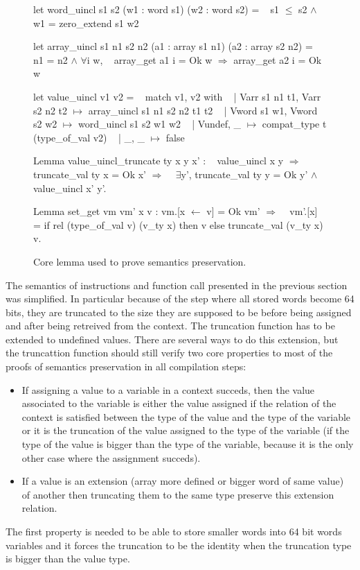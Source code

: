 \documentclass{article}
\begin{document}
\medskip

\begin{figure}[t]
\obeylines\obeyspaces\ttfamily%
let word\_uincl s1 s2 (w1 : word s1) (w2 : word s2) =
~ s1 \(\leq\) s2 \(\wedge\) w1 = zero\_extend s1 w2

let array\_uincl s1 n1 s2 n2 (a1 : array s1 n1) (a2 : array s2 n2) =
~ n1 = n2 \(\wedge\) \(\forall\)i w,
~   array\_get a1 i = Ok w \(\Longrightarrow\) array\_get a2 i = Ok w

let value\_uincl v1 v2 =
~ match v1, v2 with
~ | Varr s1 n1 t1, Varr s2 n2 t2 \(\mapsto\) array\_uincl s1 n1 s2 n2 t1 t2
~ | Vword s1 w1,   Vword s2 w2   \(\mapsto\) word\_uincl s1 s2 w1 w2
~ | Vundef,        \_             \(\mapsto\) compat\_type t (type\_of\_val v2)
~ | \_,             \_             \(\mapsto\) false

Lemma value\_uincl\_truncate ty x y x' :
~ value\_uincl x y \(\Longrightarrow\) truncate\_val ty x = Ok x' \(\Longrightarrow\)
~ \(\exists\)y', truncate\_val ty y = Ok y' \(\wedge\) value\_uincl x' y'.

Lemma set\_get vm vm' x v : vm.[x \(\leftarrow\) v] = Ok vm' \(\Longrightarrow\)
~ vm'.[x] = if rel (type\_of\_val v) (v\_ty x) then v else truncate\_val (v\_ty x) v.
\normalfont%
\caption{Core lemma used to prove semantics preservation.}
\end{figure}

The semantics of instructions and function call presented in the previous section
was simplified. In particular because of the step where all stored words become
64 bits, they are truncated to the size they are supposed to be before being
assigned and after being retreived from the context. The truncation function
has to be extended to undefined values. There are several ways to do this
extension, but the truncattion function should still verify two core properties
to most of the proofs of semantics preservation in all compilation steps:
\begin{itemize}
\item If assigning a value to a variable in a context succeds, then the value
  associated to the variable is either the value assigned if the relation of the
  context is satisfied between the type of the value and the type of the
  variable or it is the truncation of the value assigned to the type of the
  variable (if the type of the value is bigger than the type of the variable,
  because it is the only other case where the assignment succeds).
\item If a value is an extension (array more defined or bigger word of same
  value) of another then truncating them to the same type preserve this
  extension relation.
\end{itemize}
The first property is needed to be able to store smaller words into 64 bit words
variables and it forces the truncation to be the identity when the truncation
type is bigger than the value type.
\end{document}
